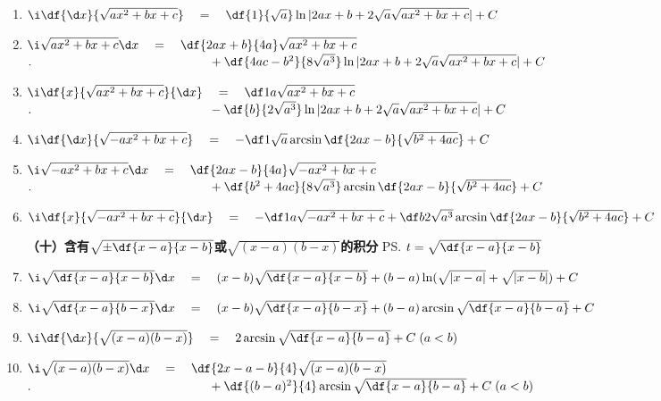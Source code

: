 \begin{enumerate}
\bigskip
{\bf （九）含有$\sqrt{\pm ax^2+bx+c}\;(a>0)$的积分}\ps{$ax^2+bx+c=a\left(x+
\df b{2a}\right)^2+c-\df{b^2}{4a}$}
  \item $\i\df{{\d x}}{\sqrt{ax^2+bx+c}}\quad=\quad\df{1}{\sqrt a}\ln|2ax+b+2\sqrt
  a\sqrt{ax^2+bx+c}|+C$
  \item $\i\sqrt{ax^2+bx+c}{\d x}\quad=\quad\df{2ax+b}{4a}\sqrt{ax^2+bx+c}$\\
  $.\hspace{5cm}+\df{4ac-b^2}{8\sqrt{a^3}}\ln|2ax+b+2\sqrt a\sqrt{ax^2+bx+c}|+C$
  \item $\i\df{x}{\sqrt{ax^2+bx+c}}{\d x}\quad=\quad\df 1a\sqrt{ax^2+bx+c}$\\
  $.\hspace{5cm}-\df{b}{2\sqrt{a^3}}\ln|2ax+b+2\sqrt a\sqrt{ax^2+bx+c}|+C$
  \item $\i\df{{\d x}}{\sqrt{-ax^2+bx+c}}\quad=\quad-\df 1{\sqrt
  a}\arcsin\df{2ax-b}{\sqrt{b^2+4ac}}+C$
  \item $\i\sqrt{-ax^2+bx+c}{\d x}\quad=\quad\df{2ax-b}{4a}\sqrt{-ax^2+bx+c}$\\
  $.\hspace{5cm}+\df{b^2+4ac}{8\sqrt{a^3}}\arcsin\df{2ax-b}{\sqrt{b^2+4ac}}+C$
  \item $\i\df{x}{\sqrt{-ax^2+bx+c}}{\d x}\quad=\quad-\df 1a\sqrt{-ax^2+bx+c}+\df
  b{2\sqrt{a^3}}\arcsin\df{2ax-b}{\sqrt{b^2+4ac}}+C$

\bigskip
{\bf （十）含有$\sqrt{\pm\df{x-a}{x-b}}$或$\sqrt{(x-a)(b-x)}$的积分}
\ps{$t=\sqrt{\df{x-a}{x-b}}$}
  \item
  $\i\sqrt{\df{x-a}{x-b}}{\d x}\quad=\quad(x-b)\sqrt{\df{x-a}{x-b}}+(b-a)\ln(\sqrt{|x-a|}+\sqrt{|x-b|})+C$
  \item $\i\sqrt{\df{x-a}{b-x}}{\d x}\quad=\quad(x-b)\sqrt{\df{x-a}{b-x}}
  +(b-a)\arcsin\sqrt{\df{x-a}{b-a}}+C$
  \item $\i\df{{\d x}}{\sqrt{(x-a)(b-x)}}\quad=\quad2\arcsin\sqrt{\df{x-a}{b-a}}+C\;(a<b)$
  \item $\i\sqrt{(x-a)(b-x)}{\d x}\quad=\quad\df{2x-a-b}{4}\sqrt{(x-a)(b-x)}$\\
  $.\hspace{5cm}+\df{(b-a)^2}{4}\arcsin\sqrt{\df{x-a}{b-a}}+C\;(a<b)$


\end{enumerate}

